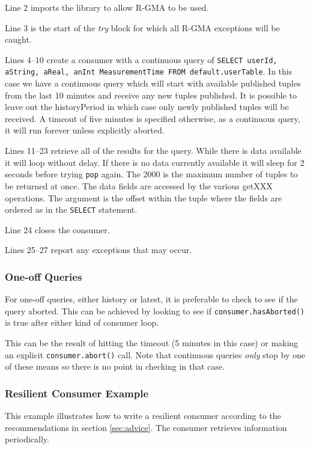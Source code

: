 Line 2 imports the library to allow R-GMA to be used.

Line 3 is the start of the \emph{try} block for which all R-GMA exceptions will
be caught.

Lines 4--10 create a consumer with a 
continuous query of \texttt{SELECT userId, aString, aReal,
anInt MeasurementTime FROM default.userTable}. In this case we have a
continuous query which will start with available published tuples from
the last 10 minutes and receive any new tuples published. It is
possible to leave out the historyPeriod in which case only newly
published tuples will be received. A timeout of five minutes is specified
otherwise, as a continuous query, it will run forever unless explicitly aborted.

Lines 11--23 retrieve all of the results for the query. While there is
data available it will loop without delay. If there is no data
currently available it will sleep for 2 seconds before trying
\texttt{pop} again. The 2000 is the maximum number of tuples to be
returned at once. The data fields are accessed by the various getXXX
operations. The argument is the offset  within the tuple where the fields are
ordered as in the \texttt{SELECT} statement.

Line 24 closes the consumer.

Lines 25--27 report any exceptions that may occur.

\subsubsection {One-off Queries}
For one-off queries, either history or latest, it is preferable to
check to see if the query aborted. This can be achieved by looking to
see if \texttt{consumer.hasAborted()} is true after either kind of
consumer loop.

This can be the result of hitting the timeout (5 minutes in this
case) or making an explicit \texttt{consumer.abort()} call. Note that
continuous queries \emph{only} stop by one of these means so there is
no point in checking in that case.

\subsubsection{Resilient Consumer Example}
This example illustrates how to write a resilient consumer according
to the recommendations in section \ref{sec:advice}.
The consumer retrieves information periodically.



